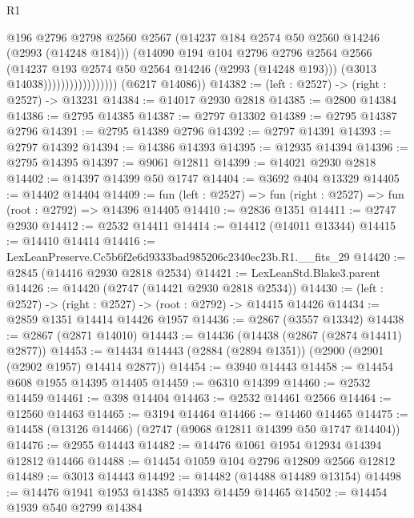 \begin{lexlean}{R1}
\begin{coremodule}
                                    @196
                                    @2796
                                    @2798
                                    @2560
                                    @2567
                                    (@14237 @184 @2574 @50 @2560 @14246 (@2993 (@14248 @184)))
                                    (@14090
                                      @194
                                      @104
                                      @2796
                                      @2796
                                      @2564
                                      @2566
                                      (@14237 @193 @2574 @50 @2564 @14246 (@2993 (@14248 @193)))
                                      (@3013 @14038)))))))))))))))))
      (@6217 @14086))
@14382 := (left : @2527) -> (right : @2527) -> @13231
@14384 := @14017 @2930 @2818
@14385 := @2800 @14384
@14386 := @2795 @14385
@14387 := @2797 @13302
@14389 := @2795 @14387 @2796
@14391 := @2795 @14389 @2796
@14392 := @2797 @14391
@14393 := @2797 @14392
@14394 := @14386 @14393
@14395 := @12935 @14394
@14396 := @2795 @14395
@14397 := @9061 @12811
@14399 := @14021 @2930 @2818
@14402 := @14397 @14399 @50 @1747
@14404 := @3692 @404 @13329
@14405 := @14402 @14404
@14409 := fun (left : @2527) => fun (right : @2527) => fun (root : @2792) => @14396 @14405
@14410 := @2836 @1351
@14411 := @2747 @2930
@14412 := @2532 @14411
@14414 := @14412 (@14011 @13344)
@14415 := @14410 @14414
@14416 := LexLeanPreserve.Cc5b6f2e6d9333bad985206c2340ec23b.R1.__fits_29
@14420 := @2845 (@14416 @2930 @2818 @2534)
@14421 := LexLeanStd.Blake3.parent
@14426 := @14420 (@2747 (@14421 @2930 @2818 @2534))
@14430 := (left : @2527) -> (right : @2527) -> (root : @2792) -> @14415 @14426
@14434 := @2859 @1351 @14414 @14426 @1957
@14436 := @2867 (@3557 @13342)
@14438 := @2867 (@2871 @14010)
@14443 := @14436 (@14438 (@2867 (@2874 @14411) @2877))
@14453 := @14434 @14443 (@2884 (@2894 @1351)) (@2900 (@2901 (@2902 @1957) @14414 @2877))
@14454 := @3940 @14443
@14458 := @14454 @608 @1955 @14395 @14405
@14459 := @6310 @14399
@14460 := @2532 @14459
@14461 := @398 @14404
@14463 := @2532 @14461 @2566
@14464 := @12560 @14463
@14465 := @3194 @14464
@14466 := @14460 @14465
@14475 := @14458 (@13126 @14466) (@2747 (@9068 @12811 @14399 @50 @1747 @14404))
@14476 := @2955 @14443
@14482 := @14476 @1061 @1954 @12934 @14394 @12812 @14466
@14488 := @14454 @1059 @104 @2796 @12809 @2566 @12812
@14489 := @3013 @14443
@14492 := @14482 (@14488 @14489 @13154)
@14498 := @14476 @1941 @1953 @14385 @14393 @14459 @14465
@14502 := @14454 @1939 @540 @2799 @14384

\end{coremodule}
\end{lexlean}
